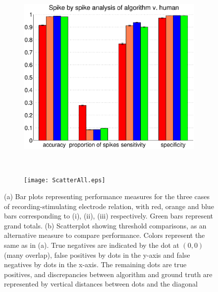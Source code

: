 \documentclass[12pt,letterpaper,fleqn]{article}
\begin{document}
\graphicspath{ {././ResultsFigures/}}
\begin{figure}[ht!]
        \centering
        \begin{subfigure}[b]{0.5\textwidth}
                \includegraphics[width=\textwidth]{Barplots.eps}
                \caption{}
                \label{resultsOverall}
        \end{subfigure}%
~\begin{subfigure}[b]{0.5\textwidth}
                \texttt{[image: ScatterAll.eps]}
                \caption{}
                \label{resultsScatter}
        \end{subfigure}
      \caption{(a) Bar plots representing performance measures for the three cases of recording-stimulating electrode relation, with red, orange and blue bars corresponding to (i), (ii), (iii) respectively. Green bars represent grand totals. (b) Scatterplot showing threshold comparisons, as an alternative measure to compare performance. Colors represent the same as in (a). True negatives are indicated by the dot at $(0,0)$ (many overlap), false positives by dots in the y-axis and false negatives by dots in the x-axis. The remaining dots are true positives, and discrepancies between algorithm and ground truth are represented by vertical distances between dots and the diagonal}
\end{figure}
\end{document}
